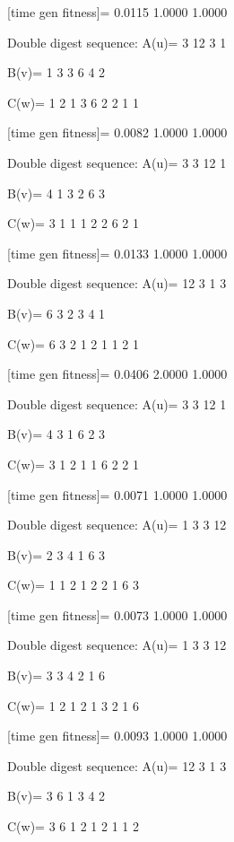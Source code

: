 [time gen fitness]=
    0.0115    1.0000    1.0000

Double digest sequence:
A(u)=
     3    12     3     1

B(v)=
     1     3     3     6     4     2

C(w)=
     1     2     1     3     6     2     2     1     1

[time gen fitness]=
    0.0082    1.0000    1.0000

Double digest sequence:
A(u)=
     3     3    12     1

B(v)=
     4     1     3     2     6     3

C(w)=
     3     1     1     1     2     2     6     2     1

[time gen fitness]=
    0.0133    1.0000    1.0000

Double digest sequence:
A(u)=
    12     3     1     3

B(v)=
     6     3     2     3     4     1

C(w)=
     6     3     2     1     2     1     1     2     1

[time gen fitness]=
    0.0406    2.0000    1.0000

Double digest sequence:
A(u)=
     3     3    12     1

B(v)=
     4     3     1     6     2     3

C(w)=
     3     1     2     1     1     6     2     2     1

[time gen fitness]=
    0.0071    1.0000    1.0000

Double digest sequence:
A(u)=
     1     3     3    12

B(v)=
     2     3     4     1     6     3

C(w)=
     1     1     2     1     2     2     1     6     3

[time gen fitness]=
    0.0073    1.0000    1.0000

Double digest sequence:
A(u)=
     1     3     3    12

B(v)=
     3     3     4     2     1     6

C(w)=
     1     2     1     2     1     3     2     1     6

[time gen fitness]=
    0.0093    1.0000    1.0000

Double digest sequence:
A(u)=
    12     3     1     3

B(v)=
     3     6     1     3     4     2

C(w)=
     3     6     1     2     1     2     1     1     2

